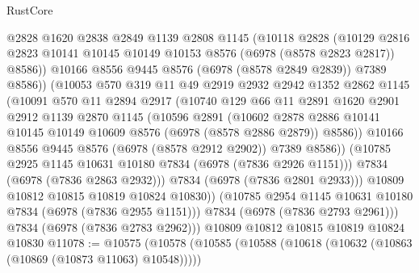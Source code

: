 \begin{lexlean}{RustCore}
\begin{coremodule}
                  @2828
                  @1620
                  @2838
                  @2849
                  @1139
                  @2808
                  @1145
                  (@10118
                    @2828
                    (@10129
                      @2816
                      @2823
                      @10141
                      @10145
                      @10149
                      @10153
                      @8576
                      (@6978 (@8578 @2823 @2817))
                      @8586))
                  @10166
                  @8556
                  @9445
                  @8576
                  (@6978 (@8578 @2849 @2839))
                  @7389
                  @8586))
              (@10053
                @570
                @319
                @11
                @49
                @2919
                @2932
                @2942
                @1352
                @2862
                @1145
                (@10091
                  @570
                  @11
                  @2894
                  @2917
                  (@10740
                    @129
                    @66
                    @11
                    @2891
                    @1620
                    @2901
                    @2912
                    @1139
                    @2870
                    @1145
                    (@10596
                      @2891
                      (@10602
                        @2878
                        @2886
                        @10141
                        @10145
                        @10149
                        @10609
                        @8576
                        (@6978 (@8578 @2886 @2879))
                        @8586))
                    @10166
                    @8556
                    @9445
                    @8576
                    (@6978 (@8578 @2912 @2902))
                    @7389
                    @8586))
                (@10785 @2925 @1145 @10631 @10180 @7834 (@6978 (@7836 @2926 @1151)))
                @7834
                (@6978 (@7836 @2863 @2932)))
              @7834
              (@6978 (@7836 @2801 @2933)))
            @10809
            @10812
            @10815
            @10819
            @10824
            @10830))
        (@10785 @2954 @1145 @10631 @10180 @7834 (@6978 (@7836 @2955 @1151)))
        @7834
        (@6978 (@7836 @2793 @2961)))
      @7834
      (@6978 (@7836 @2783 @2962)))
    @10809
    @10812
    @10815
    @10819
    @10824
    @10830
@11078 := @10575
    (@10578
      (@10585
        (@10588 (@10618 (@10632 (@10863 (@10869 (@10873 @11063) @10548)))))

\end{coremodule}
\end{lexlean}
